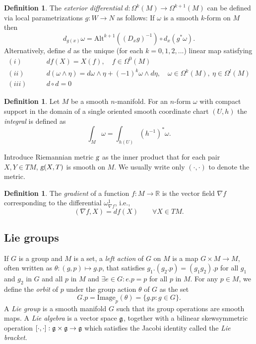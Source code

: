 \documentclass{article}
\theoremstyle{plain}
\theoremstyle{definition}
\newtheorem{defin}[teo]{Definition}
\newcommand{\R}{\ensuremath{\mathbb{R}}}
\newcommand{\g}{\ensuremath{\textsl{g}}}
\newcommand{\Alt}{\ensuremath{\mathrm{Alt}}}
\newcommand{\mf}{\ensuremath{\mathfrak}}
\begin{document}
\begin{defin}
	The \textit{exterior differential} $d:\Omega^k(M)\to \Omega^{k+1}(M)$ can be defined via local parametrizations $g:W\to N$ as follows: If $\omega$ is a smooth $k$-form on $M$ then
	\[
	d_{g(x)}\omega= \Alt^{k+1}\left((D_xg)^{-1}\right)\circ d_x(g^*\omega).
	\]
	Alternatively, define $d$ as the unique (for each $k=0,1,2,...$) linear map satisfying
	\begin{align*}
	(i)\qquad & df(X)=X(f),\quad f\in\Omega^0(M)\\
	(ii)\qquad & d(\omega\wedge \eta)=d\omega\wedge \eta + (-1)^k\omega\wedge d\eta,\quad \omega\in\Omega^k(M),\ \eta\in\Omega^l(M)\\
	(iii)\qquad & d\circ d=0
	\end{align*}
\end{defin}


\begin{defin}
	Let $M$ be a smooth $n$-manifold. For an $n$-form $\omega$ with compact support in the domain of a single oriented smooth coordinate chart $(U,h)$ the \textit{integral} is defined as 
	\[
	\int_M\omega = \int_{h(U)}\left(h^{-1}\right)^*\omega.
	\] 
\end{defin}

Introduce Riemannian metric $\g$ as the inner product that for each pair $X,Y\in TM$, $\g(X,T)$ is smooth on $M$. We usually write only $(\cdot,\cdot)$ to denote the metric.

\begin{defin}
	The \textit{gradient} of a function $f:M\to \R$ is the vector field $\nabla f$ corresponding to the differential $\omega_{\nabla f}^1$, i.e., 
	\[
	(\nabla f,X)=df(X)\qquad \forall X\in TM.
	\]
\end{defin}

\subsection{Lie groups}
If $G$ is a group and $M$ is a set, a \textit{left action} of $G$ on $M$ is a map $G\times M\to M$, often written as $\theta: (g,p)\mapsto g.p$, that satisfies $g_1.(g_2.p)=(g_1g_2).p$ for all $g_1$ and $g_2$ in $G$ and all $p$ in $M$ and $\exists e\in G: e.p=p$ for all $p$ in $M$. For any $p\in M$, we define the \textit{orbit} of $p$ under the group action $\theta$ of $G$ as the set 
\[
   G.p = \mathrm{Image}_p(\theta)= \{g.p:g\in G\}.
\]
A \textit{Lie group} is a smooth manifold $G$ such that its group operations are smooth maps. A \textit{Lie algebra} is a vector space $\mf g$, together with a bilinear skewsymmetric operation $[\cdot,\cdot]:\mf g \times \mf g \to\mf g$  which satisfies the Jacobi identity called the \textit{Lie bracket}. 
\end{document}
